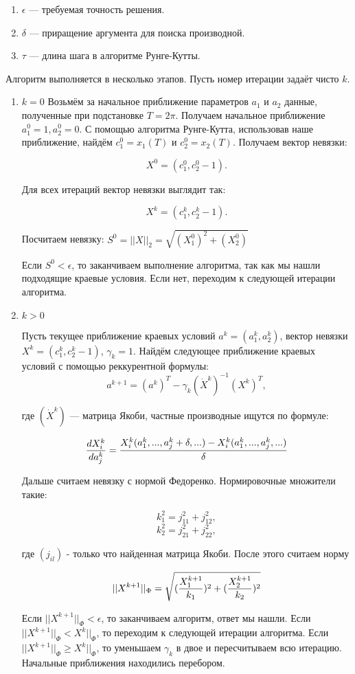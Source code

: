 \documentclass [a4paper, 12pt] {article}
\begin{document}
\begin{enumerate}

\item  $\epsilon$ --- требуемая точность решения.

\item $\delta$ --- приращение аргумента для поиска производной.

\item $\tau$ --- длина шага в алгоритме Рунге-Кутты.

\end{enumerate}

Алгоритм выполняется в несколько этапов. Пусть номер итерации задаёт чисто $k$.

\begin {enumerate}

\item $k = 0$
Возьмём за начальное приближение параметров $a_1$ и $a_2$ данные, полученные при подстановке $T = 2\pi$. Получаем начальное приближение $a_1^0 = 1, a_2^0 = 0$. С помощью алгоритма Рунге-Кутта, использовав наше приближение, найдём $c_1^0 = x_1(T)$ и $c_2^0 = x_2(T)$. Получаем вектор невязки:

$$X^0 = (c_1^0, c_2^0 - 1).$$

Для всех итераций вектор невязки выглядит так:

$$X^k = (c_1^k, c_2^k - 1).$$

Посчитаем невязку:
$S^0 = ||X||_2 = \sqrt{(X_1^0)^2 + (X_2^0)}$

Если $S^0 < \epsilon$, то заканчиваем выполнение алгоритма, так как мы нашли подходящие краевые условия. Если нет, переходим к следующей итерации алгоритма.

\item $k > 0$

Пусть текущее приближение краевых условий $a^k = (a_1^k, a_2^k)$, вектор невязки $X^k = (c_1^k, c_2^k - 1)$, $\gamma_k = 1$. Найдём следующее приближение краевых условий с помощью реккурентной формулы:
$$a^{k+1} = (a^k)^T - \gamma_k (\dot X^k)^{-1}(X^k)^T,$$

где $(\dot X^k)$ --- матрица Якоби, частные производные ищутся по формуле:

$$\genfrac{}{}{}{}{dX_i^k}{da_j^k} = \genfrac{}{}{}{}{X_i^k(a_1^k, ..., a_j^k + \delta, ...) - X_i^k(a_1^k, ..., a_j^k, ...)}{\delta}$$

Дальше считаем невязку с нормой Федоренко. Нормировочные множители такие:

$$k_1^2 = j_{11}^2 + j_{12}^2,$$
$$k_2^2 = j_{21}^2 + j_{22}^2,$$

где $(j_{il})$ - только что найденная матрица Якоби. После этого считаем норму

$$||X^{k+1}||_{\Phi} = \sqrt{(\genfrac{}{}{}{}{X_1^{k+1}}{k_1})^2 + (\genfrac{}{}{}{}{X_2^{k+1}}{k_2})^2}$$

Если $||X^{k+1}||_{\Phi} < \epsilon$, то заканчиваем алгоритм, ответ мы нашли. Если  $||X^{k+1}||_{\Phi} < X^{k}||_{\Phi}$, то переходим к следующей итерации алгоритма.  Если  $||X^{k+1}||_{\Phi} \ge X^{k}||_{\Phi}$, то уменьшаем $\gamma_k$ в двое и пересчитываем всю итерацию.
Начальные приближения находились перебором.

\end {enumerate}
\end{document}
